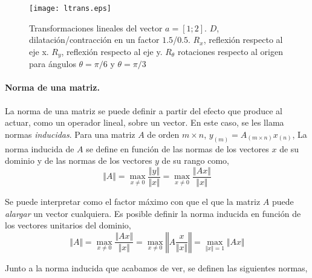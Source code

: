 \begin{figure}[h]
\centering
\texttt{[image: ltrans.eps]}
\caption{Transformaciones lineales del vector $a=[1;2]$. $D$, dilatación/contracción en un factor $1.5$/$0.5$. $R_x$, reflexión respecto al eje x. $R_y$, reflexión respecto al eje y. $R_{\theta}$ rotaciones respecto al origen para ángulos $\theta=\pi /6$ y $\theta=\pi /3$}
\label{fig:ltrans}
\end{figure}

\paragraph{Norma de una matriz.} La norma de una matriz se puede definir a partir del efecto que produce al actuar, como un operador lineal, sobre un vector. En este caso, se les llama normas \emph{inducidas}. Para una matriz $A$ de orden $m\times n$, $y_{(m)}=A_{(m\times n)}x_{(n)}$, La norma inducida de $A$ se define en función de las normas de los vectores $x$ de su dominio y de las normas de los vectores $y$ de su rango como,
\begin{equation*}
\Vert A \Vert =\max_{x \neq 0} \frac{\Vert y \Vert}{\Vert x \Vert}=\max_{x \neq 0} \frac{\Vert Ax \Vert}{\Vert x \Vert}
\end{equation*}

Se puede interpretar como el factor máximo con que el que la matriz $A$ puede \emph{alargar} un vector cualquiera. Es posible definir la norma inducida en función de los vectores unitarios del dominio,
\begin{equation*}
\Vert A \Vert =\max_{x \neq 0} \frac{\Vert Ax \Vert}{\Vert x \Vert}= \max_{x \neq 0} \left\Vert A\frac{x}{\Vert x \Vert} \right\Vert= \max_{\Vert x \Vert =1}\Vert Ax \Vert
\end{equation*}

Junto a la norma inducida que acabamos de ver, se definen las siguientes normas,


